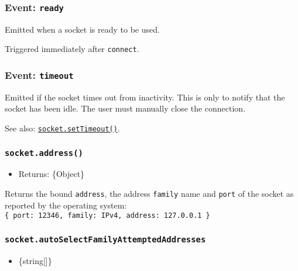 \subsubsection{\texorpdfstring{Event:
\texttt{\textquotesingle{}ready\textquotesingle{}}}{Event: \textquotesingle ready\textquotesingle{}}}\label{event-ready}

Emitted when a socket is ready to be used.

Triggered immediately after
\texttt{\textquotesingle{}connect\textquotesingle{}}.

\subsubsection{\texorpdfstring{Event:
\texttt{\textquotesingle{}timeout\textquotesingle{}}}{Event: \textquotesingle timeout\textquotesingle{}}}\label{event-timeout}

Emitted if the socket times out from inactivity. This is only to notify
that the socket has been idle. The user must manually close the
connection.

See also:
\hyperref[socketsettimeouttimeout-callback]{\texttt{socket.setTimeout()}}.

\subsubsection{\texorpdfstring{\texttt{socket.address()}}{socket.address()}}\label{socket.address}

\begin{itemize}
\tightlist
\item
  Returns: \{Object\}
\end{itemize}

Returns the bound \texttt{address}, the address \texttt{family} name and
\texttt{port} of the socket as reported by the operating system:
\texttt{\{\ port:\ 12346,\ family:\ \textquotesingle{}IPv4\textquotesingle{},\ address:\ \textquotesingle{}127.0.0.1\textquotesingle{}\ \}}

\subsubsection{\texorpdfstring{\texttt{socket.autoSelectFamilyAttemptedAddresses}}{socket.autoSelectFamilyAttemptedAddresses}}\label{socket.autoselectfamilyattemptedaddresses}

\begin{itemize}
\tightlist
\item
  \{string{[}{]}\}
\end{itemize}

